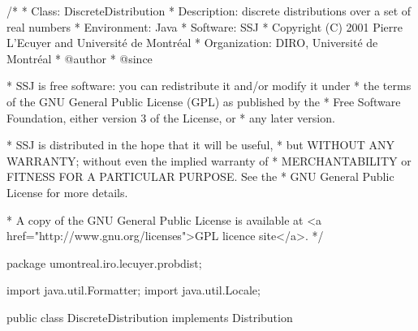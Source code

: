\begin{code}
\begin{hide}
/*
 * Class:        DiscreteDistribution
 * Description:  discrete distributions over a set of real numbers
 * Environment:  Java
 * Software:     SSJ 
 * Copyright (C) 2001  Pierre L'Ecuyer and Université de Montréal
 * Organization: DIRO, Université de Montréal
 * @author       
 * @since

 * SSJ is free software: you can redistribute it and/or modify it under
 * the terms of the GNU General Public License (GPL) as published by the
 * Free Software Foundation, either version 3 of the License, or
 * any later version.

 * SSJ is distributed in the hope that it will be useful,
 * but WITHOUT ANY WARRANTY; without even the implied warranty of
 * MERCHANTABILITY or FITNESS FOR A PARTICULAR PURPOSE.  See the
 * GNU General Public License for more details.

 * A copy of the GNU General Public License is available at
   <a href="http://www.gnu.org/licenses">GPL licence site</a>.
 */
\end{hide}
package umontreal.iro.lecuyer.probdist;\begin{hide}

import java.util.Formatter;
import java.util.Locale;\end{hide}


public class DiscreteDistribution implements Distribution\begin{hide} {
  /*
     For better precision in the tails, we keep the cumulative probabilities
     (F) in cdf[x] for x <= xmed (i.e. cdf[x] is the sum off all the probabi-
     lities pr[i] for i <= x),
     and the complementary cumulative probabilities (1 - F) in cdf[x] for
     x > xmed (i.e. cdf[x] is the sum off all the probabilities pr[i]
     for i >= x).
  */

   protected double cdf[] = null;    // cumulative probabilities
   protected double pr[] = null;     // probability terms or mass distribution
   protected int xmin = 0;           // pr[x] = 0 for x < xmin
   protected int xmax = 0;           // pr[x] = 0 for x > xmax
   protected int xmed = 0;           // cdf[x] = F(x) for x <= xmed, and
                                     // cdf[x] = bar_F(x) for x > xmed
   protected int nVal;               // number of different values
   protected double sortedVal[];
   protected double supportA = Double.NEGATIVE_INFINITY;
   protected double supportB = Double.POSITIVE_INFINITY;
\end{hide}
\end{code}


